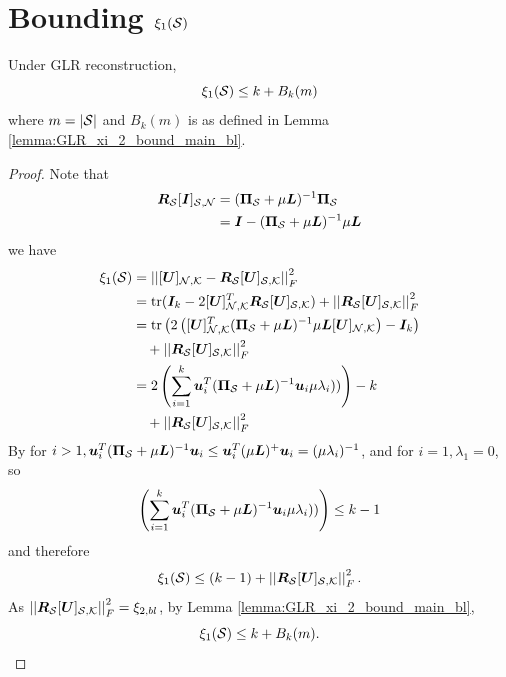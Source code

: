 \section{Bounding $\xi_{1}(\mathcal{S})$}
\label{app:proof_unif_ub_xi_1_MSE}
\begin{lemma}
\label{lemma:unif_ub_xi_1_GLR}
Under GLR reconstruction,
\begin{equation}
    \xi_{1}(\mathcal{S}) \leq k + B_{k}(m)
\end{equation}
    where $m=|\mathcal{S}|$ and $B_{k}(m)$ is as defined in Lemma \ref{lemma:GLR_xi_2_bound_main_bl}.
\end{lemma}
\begin{proof}
    
Note that 
\begin{align}
    \matr{R}_{\set{S}}\matrsub[S,N]{I} &= (\matr{\Pi}_{\set{S}} + \mu\matr{L})^{-1}\matr{\Pi}_{\set{S}}  \\
    &= \matr{I} - (\matr{\Pi}_{\set{S}} + \mu\matr{L})^{-1}\mu \matr{L}
\end{align}
we have
\begin{align}
    \xi_{1}(\set{S}) &= \sqfrob{\matrsubU{N} - \matr{R}_{\set{S}}\matrsubU{S}} \\
    &= \textrm{tr}(\matr{I}_{k} - 2\matrsubU{N}^{T}\matr{R}_{\set{S}}\matrsubU{S}) + \sqfrob{\matr{R}_{\set{S}}\matrsubU{S}} \\
    &= \textrm{tr}\left(2\left(\matrsubU{N}^{T}(\matr{\Pi}_{\set{S}} + \mu\matr{L})^{-1}\mu \matr{L}\matrsubU{N}\right) - \matr{I}_{k}\right)  \\
    &\quad + 
 \sqfrob{\matr{R}_{\set{S}}\matrsubU{S}} \\
    &= 2\left(\sum_{i=1}^{k}\vect{u}_{i}^{T}(\matr{\Pi}_{\set{S}} + \mu\matr{L})^{-1}\vect{u}_{i}\mu\lambda_{i}))\right) - k  \\
    &\quad + \sqfrob{\matr{R}_{\set{S}}\matrsubU{S}}
\end{align}
By \cite[Eq. (1.7)]{nordstrom2011convexity} for $i>1, \bm{u}_{i}^{T}(\bm{\Pi}_{\mathcal{S}} + \mu\bm{L})^{-1}\bm{u}_{i} \leq \bm{u}_{i}^{T}(\mu\bm{L})^{+}\bm{u}_{i} = (\mu\lambda_{i})^{-1}$, and for $i=1, \lambda_{1} = 0$, so
\begin{equation}
    \left(\sum_{i=1}^{k}\bm{u}_{i}^{T}(\bm{\Pi}_{\mathcal{S}} + \mu\bm{L})^{-1}\bm{u}_{i}\mu\lambda_{i}))\right) \leq k-1 
\end{equation}
and therefore
\begin{equation}
    \xi_{1}(\set{S}) \leq (k-1) + \sqfrob{\matr{R}_{\set{S}}\matrsubU{S}}.
\end{equation}
As $\sqfrob{\matr{R}_{\set{S}}\matrsubU{S}} = \xi_{2,bl}$, by Lemma \ref{lemma:GLR_xi_2_bound_main_bl},
\begin{equation}
    \xi_{1}(\mathcal{S}) \leq k + B_{k}(m).
\end{equation}

\end{proof}

